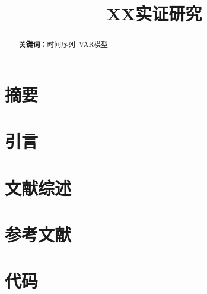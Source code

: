 \documentclass[nobib]{tufte-handout}
\title{XX实证研究}
\def\keywords#1{\noindent\textbf{关键词：}#1}
\begin{document}
    \maketitle    

    \section{摘要}
    \begin{abstract}
        \keywords{时间序列\ VAR模型}
    \end{abstract}

    \section{引言}

    \section{文献综述}
    \section{参考文献}

    \appendix
    \section{代码}
\end{document}
